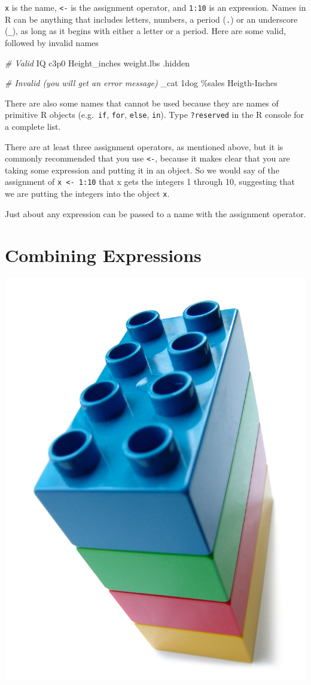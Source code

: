 \documentclass[
]{book}
\newenvironment{Shaded}{\begin{snugshade}}{\end{snugshade}}
\newcommand{\CommentTok}[1]{\textcolor[rgb]{0.56,0.35,0.01}{\textit{#1}}}
\newcommand{\NormalTok}[1]{#1}
\newcommand{\SpecialCharTok}[1]{\textcolor[rgb]{0.00,0.00,0.00}{#1}}
\begin{document}
\texttt{x} is the name, \texttt{\textless{}-} is the assignment operator, and \texttt{1:10} is an expression.
Names in R can be anything that includes letters, numbers, a period (\texttt{.}) or an underscore (\texttt{\_}), as long as it begins with either a letter or a period.
Here are some valid, followed by invalid names

\begin{Shaded}
\begin{Highlighting}[]
\CommentTok{\# Valid}
\NormalTok{IQ}
\NormalTok{c3p0}
\NormalTok{Height\_inches}
\NormalTok{weight.lbs}
\NormalTok{.hidden}

\CommentTok{\# Invalid (you will get an error message)}
\NormalTok{\_cat}
\NormalTok{1dog}
\NormalTok{\%sales}
\NormalTok{Heigth}\SpecialCharTok{{-}}\NormalTok{Inches}
\end{Highlighting}
\end{Shaded}

There are also some names that cannot be used because they are names of primitive R objects (e.g.~\texttt{if}, \texttt{for}, \texttt{else}, \texttt{in}).
Type \texttt{?reserved} in the R console for a complete list.

There are at least three assignment operators, as mentioned above, but it is commonly recommended that you use \texttt{\textless{}-}, because it makes clear that you are taking some expression and putting it in an object.
So we would say of the assignment of \texttt{x\ \textless{}-\ 1:10} that x gets the integers 1 through 10, suggesting that we are putting the integers into the object \texttt{x}.

Just about any expression can be passed to a name with the assignment operator.

\hypertarget{combining-expressions}{%
\section{Combining Expressions}\label{combining-expressions}}

\includegraphics[width=0.3\linewidth]{figures/blockstack}
\end{document}
